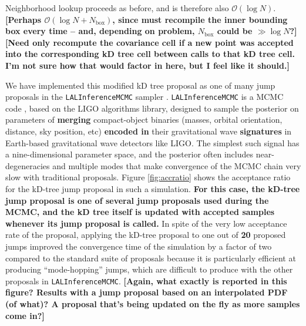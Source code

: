 \documentclass{iopart}
\newcommand{\Nbox}{N_\mathrm{box}}
\newcommand{\ilya}[1]{{\color{red} \bf #1}}
\newcommand{\dan}[1]{{\color{magenta} \bf #1}}
\newcommand{\order}[1]{\mathcal{O}\left( #1 \right)}
\begin{document}
Neighborhood lookup proceeds as before, and is therefore also
$\order{\log N}$.  \ilya{[Perhaps $\order{\log N + \Nbox}$, since must recompile the inner bounding box every time -- and, depending on problem, $\Nbox$ could be $\gg \log N$?]} \dan{[Need only recompute the covariance cell if a new point was accepted into the corresponding kD tree cell between calls to that kD tree cell. I'm not sure how that would factor in here, but I feel like it should.] }

We have implemented this modified kD tree proposal as one of many jump
proposals in the \texttt{LALInferenceMCMC} sampler
\cite{vanderSluys:2008a,Raymond:2010,Raymond2012}.
\texttt{LALInferenceMCMC} is a MCMC code \cite{lalinf_method}, based on the LIGO algorithms
library, designed to sample the posterior on parameters of \ilya{merging}
compact-object binaries (masses, orbital orientation, distance, sky
position, etc) \ilya{encoded in} their gravitational wave \ilya{signatures} in
Earth-based gravitational wave detectors like LIGO.  The simplest such
signal has a nine-dimensional parameter space, and the posterior often
includes near-degeneracies and multiple modes that make convergence of
the MCMC chain very slow with traditional proposals.  Figure
\ref{fig:accratio} shows the acceptance ratio for the kD-tree jump
proposal in such a simulation.  \dan{For this case, the kD-tree jump proposal is one of several jump proposals used during the MCMC, and the kD tree itself is updated with accepted samples whenever its jump proposal is called.}
In spite of the very low acceptance
rate of the proposal, applying the kD-tree proposal to one out of
\dan{20} proposed jumps improved the convergence time of the simulation
by a factor of two compared to the standard suite of proposals because
it is particularly efficient at producing ``mode-hopping'' jumps,
which are difficult to produce with the other proposals in
\texttt{LALInferenceMCMC}.  \ilya{[Again, what exactly is reported in this figure?  Results with a jump proposal based on an interpolated PDF (of what)?  A proposal that's being updated on the fly as more samples come in?]}
\end{document}
